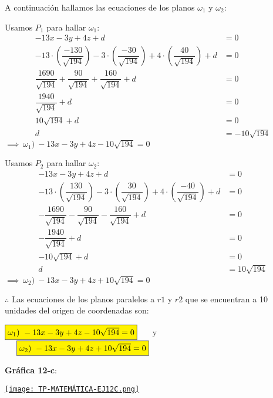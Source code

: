 \vspace{1cm}
\noindent A continuación hallamos las ecuaciones de los planos $\omega_1$ y $\omega_2$:

\noindent Usamos $P_1$ para hallar $\omega_1$:
\begin{align*}
	-13x - 3y + 4z + d                                 & = 0                     \\
	-13 \cdot \left( \dfrac{-130}{\sqrt{194}}\right)
	- 3 \cdot \left( \dfrac{-30}{\sqrt{194}}\right)
	+ 4 \cdot \left( \dfrac{40}{\sqrt{194}}\right) + d & = 0                     \\
	\dfrac{1690}{\sqrt{194}} + \dfrac{90}{\sqrt{194}}
	+ \dfrac{160}{\sqrt{194}} + d                      & = 0                     \\
	\dfrac{1940}{\sqrt{194}} + d                       & = 0                     \\
	10\sqrt{194} + d                                   & = 0                     \\
	d                                                  & = \boxed{-10\sqrt{194}}
\end{align*}
$\implies \ \omega_1) \ -13x - 3y + 4z -10\sqrt{194} = 0$

\noindent Usamos $P_2$ para hallar $\omega_2$:
\begin{align*}
	-13x - 3y + 4z + d                                  & = 0                    \\
	-13 \cdot \left( \dfrac{130}{\sqrt{194}}\right)
	- 3 \cdot \left( \dfrac{30}{\sqrt{194}}\right)
	+ 4 \cdot \left( \dfrac{-40}{\sqrt{194}}\right) + d & = 0                    \\
	- \dfrac{1690}{\sqrt{194}} - \dfrac{90}{\sqrt{194}}
	- \dfrac{160}{\sqrt{194}} + d                       & = 0                    \\
	- \dfrac{1940}{\sqrt{194}} + d                      & = 0                    \\
	- 10\sqrt{194} + d                                  & = 0                    \\
	d                                                   & = \boxed{10\sqrt{194}}
\end{align*}
$\implies \ \omega_2) \ -13x - 3y + 4z + 10\sqrt{194} = 0$

\vspace{1cm}
\noindent $\therefore$ Las ecuaciones de los planos paralelos a $r1$ y $r2$ que se encuentran a 10 unidades del origen de coordenadas son:

\begin{center}
	$\fcolorbox{black}{yellow}{$\omega_1) \ -13x - 3y + 4z -10\sqrt{194} = 0$} \hspace*{0.5cm}$ y
	$\hspace*{0.5cm} \fcolorbox{black}{yellow}{$\omega_2) \ -13x - 3y + 4z + 10\sqrt{194} = 0$}$
\end{center}

\vspace{2cm}
\noindent \textbf{Gráfica 12-c}:
\begin{center}
	\href{https://www.geogebra.org/3d/fmkxhwqc}{\texttt{[image: TP-MATEMÁTICA-EJ12C.png]}}
\end{center}
